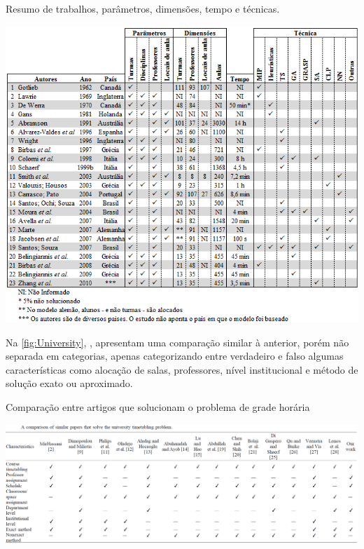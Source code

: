 
\begin{CenteredFigure} \caption{Resumo de trabalhos, parâmetros, dimensões, tempo e técnicas.} \label{fig:Desenvolvimento}
  \includegraphics[width=\textwidth]{files/img/2.02!2-marco/Desenvolvimento}
\end{CenteredFigure}    %

Na \autoref{fig:University}, , apresentam uma comparação similar à anterior, porém não separada em categorias, apenas categorizando entre verdadeiro e falso algumas características como alocação de salas, professores, nível institucional e método de solução exato ou aproximado.

\begin{CenteredFigure} \caption{Comparação entre artigos que solucionam o problema de grade horária} \label{fig:University}
  \includegraphics[width=\textwidth]{files/img/2.02!2-marco/University}
\end{CenteredFigure}    %

